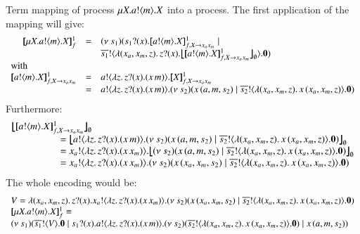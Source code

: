 \begin{example}

 Term mapping of \HOp process $\mu X. a ! \langle m \rangle . X$
into a \HO process. The first application of the mapping
will give:
%
\[
\begin{array}{rcl}
	\pmapp{\recp{X}{\bout{a}{m} \varp{X}}}{1}{f} &=&
	\newsp{s_1}{ \binp{s_1}{x} \pmapp{\bout{a}{m} \varp{X}}{1}{f, \varp{X} \rightarrow x_ax_m} \Par\\
	&&\bout{\dual{s_1}}{ \abs{(x_a, x_m, z)} \binp{z}{x} \auxmap{\pmapp{\bout{a}{m} \varp{X}}{1}{f, \varp{X} \rightarrow x_ax_m}}{\es} } \inact}
	\\
	\multicolumn{3}{l}{\textrm{with}}
	\\
	\pmapp{\bout{a}{m} \varp{X}}{1}{f, \varp{X} \rightarrow x_ax_m} &=&
	\bout{a}{\abs{z}{\binp{z}{x} (\appl{x}{m})}} \pmapp{\varp{X}}{1}{f, \varp{X} \rightarrow x_ax_m}
	\\
	&=& \bout{a}{\abs{z}{\binp{z}{x} (\appl{x}{m})}} \newsp{s_2}{\appl{x}{(a,m, s_2)}  \Par \bout{\dual{s_2}}{\abs{(x_a, x_m, z)}{\appl{x}{(x_a, x_m, z)}}} \inact}
\end{array}
\]
%
\noi Furthermore:
%
\[
\begin{array}{l}
	\auxmap{\pmapp{\bout{a}{m} \varp{X}}{1}{f, \varp{X} \rightarrow x_ax_m}}{\es}\\
	\qquad \qquad \quad = \auxmap{\bout{a}{\abs{z}{\binp{z}{x} (\appl{x}{m})}} \newsp{s_2}{\appl{x}{(a,m, s_2)}  \Par \bout{\dual{s_2}}{\abs{(x_a, x_m, z)}{\appl{x}{(x_a, x_m, z)}}} \inact}}{\es}
	\\
	\qquad \qquad \quad = \bout{x_a}{\abs{z}{\binp{z}{x} (\appl{x}{x_m})}} \auxmap{\newsp{s_2}{\appl{x}{(a,m, s_2)}  \Par \bout{\dual{s_2}}{\abs{(x_a, x_m, z)}{\appl{x}{(x_a, x_m, z)}}} \inact}}{\es}
	\\
	\qquad \qquad \quad = \bout{x_a}{\abs{z}{\binp{z}{x} (\appl{x}{x_m})}} \newsp{s_2}{\appl{x}{(x_a,x_m, s_2)}  \Par \bout{\dual{s_2}}{\abs{(x_a, x_m, z)}{\appl{x}{(x_a, x_m, z)}}} \inact}
\end{array}
\]
%
\noi The whole encoding would be:
%
\[
\begin{array}{l}
	V = \abs{(x_a, x_m, z)} \binp{z}{x} \bout{x_a}{\abs{z}{\binp{z}{x} (\appl{x}{x_m})}} \newsp{s_2}{\appl{x}{(x_a,x_m, s_2)}  \Par \bout{\dual{s_2}}{\abs{(x_a, x_m, z)}{\appl{x}{(x_a, x_m, z)}}} \inact}\\
	\pmapp{\recp{X}{\bout{a}{m} \varp{X}}}{1}{f} \scong \\
	\newsp{s_1}{\bout{\dual{s_1}}{V} \inact \Par \binp{s_1}{x} \bout{a}{\abs{z}{\binp{z}{x} (\appl{x}{m})}} \newsp{s_2}{\bout{\dual{s_2}}{\abs{(x_a, x_m, z)}{\appl{x}{(x_a, x_m, z)}}} \inact} \Par \appl{x}{(a,m, s_2)}}
\end{array}
\]


\end{example}

